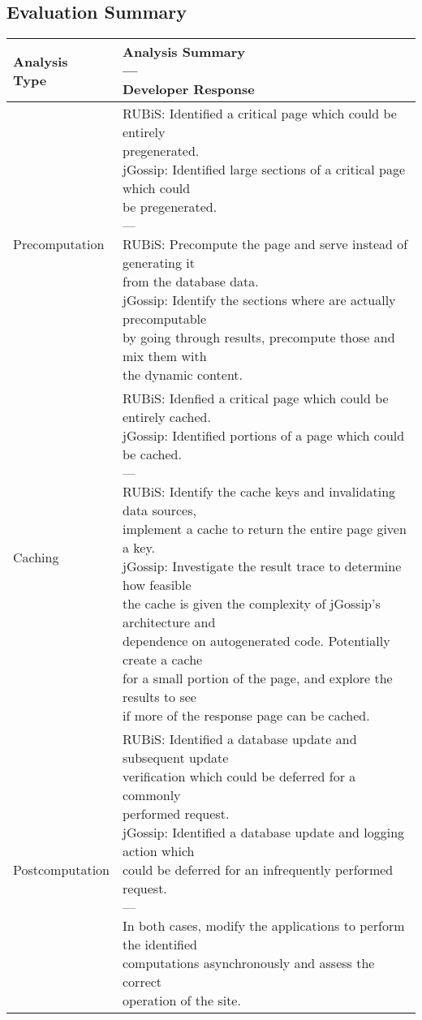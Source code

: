 \documentclass[msc,oneside]{ubcthesis}
\makeatletter
\newcommand{\specialcell}[2][c]{%
  \begin{tabular}[#1]{@{}l@{}}#2\end{tabular}}
\makeatother
\begin{document}
\subsection{Evaluation Summary}
\begin{longtable}{|l|l|}
      \hline
      \specialcell[t]{Analysis\\Type} & \specialcell[t]{Analysis Summary\\---\\Developer Response} \\ \hline\hline
      Precomputation & \specialcell[t]{RUBiS: Identified a critical page which could be entirely \\pregenerated.\\ jGossip: Identified large sections of a critical page which could \\be pregenerated. \\---\\RUBiS: Precompute the page and serve instead of generating it\\ from the database data.\\ jGossip: Identify the sections where are actually precomputable\\ by going through results, precompute those and mix them with \\the dynamic content.} \\ \hline
      Caching & \specialcell[t]{RUBiS: Idenfied a critical page which could be entirely cached.\\ jGossip: Identified portions of a page which could be cached. \\---\\RUBiS: Identify the cache keys and invalidating data sources,\\ implement a cache to return the entire page given a key.\\ jGossip: Investigate the result trace to determine how feasible\\ the cache is given the complexity of jGossip's architecture and \\dependence on autogenerated code. Potentially create a cache\\ for a small portion of the page, and explore the results to see\\ if more of the response page can be cached.} \\ \hline
      Postcomputation & \specialcell[t]{RUBiS: Identified a database update and subsequent update\\ verification which could be deferred for a commonly\\ performed request.\\ jGossip: Identified a database update and logging action which\\ could be deferred for an infrequently performed request. \\---\\In both cases, modify the applications to perform the identified\\ computations asynchronously and assess the correct \\operation of the site.} \\ \hline

\end{longtable}
\end{document}

